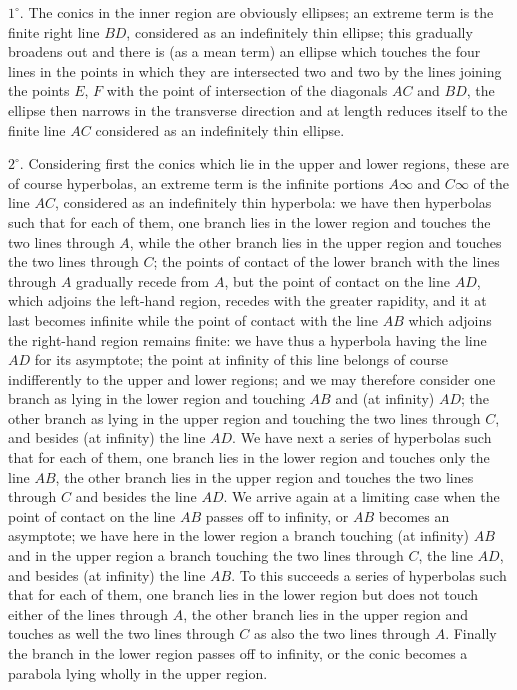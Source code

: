 \documentclass[11pt,a4paper]{article}
\theoremstyle{plain}
\begin{document}
$1^\circ$. The conics in the inner region are obviously ellipses; an extreme term is the finite right line $BD$, considered as an indefinitely thin ellipse; this gradually broadens out and there is (as a mean term) an ellipse which touches the four lines in the points in which they are intersected two and two by the lines joining the points $E$, $F$ with the point of intersection of the diagonals $AC$ and $BD$, the ellipse then narrows in the transverse direction and at length reduces itself to the finite line $AC$ considered as an indefinitely thin ellipse.

$2^\circ$. Considering first the conics which lie in the upper and lower regions, these are of course hyperbolas, an extreme term is the infinite portions $A\infty$ and $C\infty$ of the line $AC$, considered as an indefinitely thin hyperbola: we have then hyperbolas such that for each of them, one branch lies in the lower region and touches the two lines through $A$, while the other branch lies in the upper region and touches the two lines through $C$; the points of contact of the lower branch with the lines through $A$ gradually recede from $A$, but the point of contact on the line $AD$, which adjoins the left-hand region, recedes with the greater rapidity, and it at last becomes infinite while the point of contact with the line $AB$ which adjoins the right-hand region remains finite: we have thus a hyperbola having the line $AD$ for its asymptote; the point at infinity of this line belongs of course indifferently to the upper and lower regions; and we may therefore consider one branch as lying in the lower region and touching $AB$ and (at infinity) $AD$; the other branch as lying in the upper region and touching the two lines through $C$, and besides (at infinity) the line $AD$. We have next a series of hyperbolas such that for each of them, one branch lies in the lower region and touches only the line $AB$, the other branch lies in the upper region and touches the two lines through $C$ and besides the line $AD$. We arrive again at a limiting case when the point of contact on the line $AB$ passes off to infinity, or $AB$ becomes an asymptote; we have here in the lower region a branch touching (at infinity) $AB$ and in the upper region a branch touching the two lines through $C$, the line $AD$, and besides (at infinity) the line $AB$. To this succeeds a series of hyperbolas such that for each of them, one branch lies in the lower region but does not touch either of the lines through $A$, the other branch lies in the upper region and touches as well the two lines through $C$ as also the two lines through $A$. Finally the branch in the lower region passes off to infinity, or the conic becomes a parabola lying wholly in the upper region.
\end{document}
